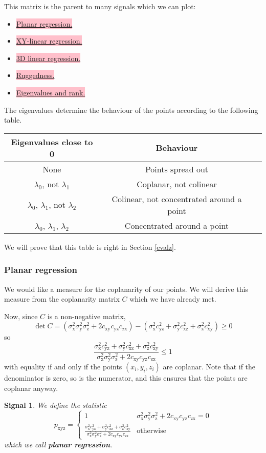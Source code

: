\documentclass[a4paper,11pt,twoside]{article}
\newtheorem*{signals}{Signal}
\theoremstyle{definition}
\theoremstyle{remark}
\newcommand{\x}{\mathrm{x}}
\newcommand{\y}{\mathrm{y}}
\newcommand{\z}{\mathrm{z}}
\newcommand{\sh}[1]{\colorbox{pink}{#1}}
\newenvironment{sigs}
   {\colorlet{shadecolor}{green!50}\begin{shaded}\begin{signals}}
   {\end{signals}\end{shaded}}
\begin{document}
This matrix is the parent to many signals which we can plot:
\begin{itemize}
\item \hyperref[lab0]{\sh{Planar regression.}}
\item \hyperref[lab1]{\sh{XY-linear regression.}}
\item \hyperref[lab2]{\sh{3D linear regression.}}
\item \hyperref[lab3]{\sh{Ruggedness.}}
\item \hyperref[evalz]{\sh{Eigenvalues and rank.}}
\end{itemize}
The eigenvalues determine the behaviour of the points according to the following table.
\begin{center}
\begin{tabular}{| c|c|c }
 Eigenvalues close to 0 & Behaviour  \\\hline 
  None & Points spread out \\
 $\lambda_0$, not $\lambda_1$& Coplanar, not colinear\\ 
 $\lambda_0$, $\lambda_1$, not $\lambda_2$ & Colinear, not concentrated around a point \\  
 $\lambda_0$, $\lambda_1$, $\lambda_2$ & Concentrated around a point
\end{tabular}
\end{center}
We will prove that this table is right in Section \hyperref[evals]{\ref*{evalz}}.
\newpage
\subsubsection{Planar regression}\label{lab0}
We would like a measure for the coplanarity of our points. We will derive this measure from the coplanarity matrix $C$ which we have already met.

Now, since $C$ is a non-negative matrix,
\begin{displaymath}
\det C = (\sigma_\x^2\sigma_\y^2\sigma_\z^2+2c_{\x\y}c_{\y\z}c_{\z\x})-(\sigma_\x^2c_{\y\z}^2+\sigma_\y^2c_{\x\z}^2+\sigma_\z^2c_{\x\y}^2)\geqslant 0
\end{displaymath}
so 
\begin{displaymath}
\frac{\sigma_\x^2c_{\y\z}^2+\sigma_\y^2c_{\x\z}^2+\sigma_\z^2c_{\x\y}^2}{\sigma_\x^2\sigma_\y^2\sigma_\z^2+2c_{\x\y}c_{\y\z}c_{\z\x}}\leqslant 1
\end{displaymath}
with equality if and only if the points $(x_i,y_i,z_i)$ are coplanar. Note that if the denominator is zero, so is the numerator, and this ensures that the points are coplanar anyway.
\begin{sigs}
We define the statistic
\begin{displaymath}
p_{\x\y\z}=\begin{cases}1&\sigma_\x^2\sigma_\y^2\sigma_\z^2+2c_{\x\y}c_{\y\z}c_{\z\x}=0\\
{\displaystyle \frac{\sigma_\x^2c_{\y\z}^2+\sigma_\y^2c_{\x\z}^2+\sigma_\z^2c_{\x\y}^2}{\sigma_\x^2\sigma_\y^2\sigma_\z^2+2c_{\x\y}c_{\y\z}c_{\z\x}}}&\text{otherwise}
\end{cases}
\end{displaymath}
which we call \textbf{planar regression}.
\end{sigs}
\end{document}
